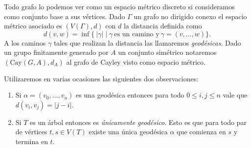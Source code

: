 \documentclass[tesis.tex]{subfiles}
\begin{document}
Todo grafo lo podemos ver como un espacio métrico discreto si consideramos como conjunto base a sus vértices. 
Dado $\Gamma$ un grafo no dirigido conexo el espacio métrico asociado es 
$ (V(\Gamma), d )$ con $d$ la distancia definida como 
\[
	d(v,w) = \inf \{ \  |\gamma|  \mid  \gamma \ \text{es un camino y} \ 
	\gamma=(v,\dots, w)  \}.
\] 
A los caminos $\gamma$ tales que realizan la distancia las llamaremos \emph{geodésicas}.
Dado un grupo finitamente generado por $A$ un conjunto simétrico notaremos $(\text{Cay}(G,A), d_{A})$ al grafo de Cayley visto como espacio métrico.

Utilizaremos en varias ocasiones las siguientes dos observaciones:

\begin{enumerate}
	\item Si $\alpha = (v_{0}, \dots, v_{n})$ es una geodésica entonces para todo $0 \le i,j \le n$ vale que  $d(v_{i}, v_{j}) = |j-i|$.
	\item Si $T$ es un árbol entonces es \emph{únicamente geodésico}.
	Esto es que para todo par de vértices $t,s \in V(T)$ existe una única geodésica $\alpha$ que comienza en $s$ y termina en $t$.
\end{enumerate}
\end{document}
